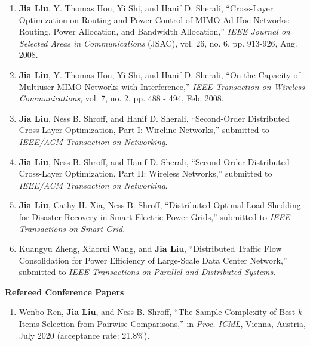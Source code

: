 \documentclass[overlapped,line,letterpaper]{res1}
\begin{document}
\begin{resume}
\begin{enumerate}
\vspace*{.08in} \item \textbf{Jia Liu}, Y. Thomas Hou, Yi Shi, and Hanif D. Sherali, ``Cross-Layer Optimization on Routing and Power Control of MIMO Ad Hoc Networks: Routing, Power Allocation, and Bandwidth Allocation,'' {\em IEEE Journal on Selected Areas in Communications} (JSAC), vol. 26, no. 6, pp. 913-926, Aug. 2008.

\vspace {.08in} \item \textbf{Jia Liu}, Y. Thomas Hou, Yi Shi, and Hanif D. Sherali, ``On the Capacity of Multiuser MIMO Networks with Interference,'' {\em IEEE Transaction on Wireless Communications}, vol. 7, no. 2, pp. 488 - 494, Feb. 2008.


\vspace {.08in} \item \textbf{Jia Liu}, Ness B. Shroff, and Hanif D. Sherali, ``Second-Order Distributed Cross-Layer Optimization, Part I: Wireline Networks,'' submitted to {\em IEEE/ACM Transaction on Networking}.

\vspace {.08in} \item \textbf{Jia Liu}, Ness B. Shroff, and Hanif D. Sherali, ``Second-Order Distributed Cross-Layer Optimization, Part II: Wireless Networks,'' submitted to {\em IEEE/ACM Transaction on Networking}.

\vspace {.08in} \item \textbf{Jia Liu}, Cathy H. Xia, Ness B. Shroff, ``Distributed Optimal Load Shedding for Disaster Recovery in Smart Electric Power Grids,'' submitted to {\em IEEE Transactions on Smart Grid}.

\vspace {.08in} \item Kuangyu Zheng, Xiaorui Wang, and \textbf{Jia Liu}, ``Distributed Traffic Flow Consolidation for Power Efficiency of Large-Scale Data Center Network,'' submitted to {\em IEEE Transactions on Parallel and Distributed Systems}.


\end{enumerate}

\hspace{-.6in} {\bf Refereed Conference Papers}
\begin{enumerate}

\vspace*{.08in} \item Wenbo Ren, {\bf Jia Liu}, and Ness B. Shroff, ``The Sample Complexity of Best-$k$ Items Selection from Pairwise Comparisons,'' in {\em Proc. ICML}, Vienna, Austria, July 2020 (acceptance rate: 21.8\%).


\end{enumerate}
\end{resume}
\end{document}
